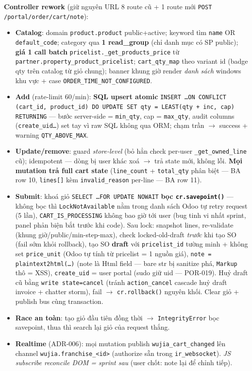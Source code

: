 \textbf{Controller rework} (giữ nguyên URL 8 route cũ + 1 route mới \texttt{POST
/portal/order/cart/note}):
\begin{itemize}
\item \textbf{Catalog}: domain \texttt{product.product} public+active; keyword tìm
      \texttt{name} OR \texttt{default\_code}; category qua \textbf{1 read\_group} (chỉ danh mục
      có SP public); \textbf{giá 1 call batch} \texttt{pricelist.\_get\_products\_price} từ
      \texttt{partner.property\_product\_pricelist}; \texttt{cart\_qty\_map} theo variant id
      (badge qty trên catalog từ giỏ chung); banner khung giờ render \emph{danh sách} windows
      khu vực + case \texttt{ORDER\_TIME\_NOT\_CONFIGURED}.
\item \textbf{Add} (rate-limit 60/min): \textbf{SQL upsert atomic} \texttt{INSERT \ldots ON
      CONFLICT (cart\_id, product\_id) DO UPDATE SET qty = LEAST(qty + inc, cap) RETURNING}
      --- bước server-side = \texttt{min\_qty}, cap = \texttt{max\_qty}, audit columns
      (\texttt{create\_uid\ldots}) set tay vì raw SQL không qua ORM; chạm trần $\rightarrow$
      success + warning \texttt{QTY\_ABOVE\_MAX}.
\item \textbf{Update/remove}: guard \emph{store-level} (bỏ hẳn check per-user
      \texttt{\_get\_owned\_line} cũ); idempotent --- dòng bị user khác xoá $\rightarrow$ trả state
      mới, không lỗi. \textbf{Mọi mutation trả full cart state} (\texttt{line\_count} +
      \texttt{total\_qty} phân biệt --- BA row 10, \texttt{lines[]} kèm
      \texttt{invalid\_reason} per-line --- BA row 11).
\item \textbf{Submit}: khoá giỏ \texttt{SELECT \ldots FOR UPDATE NOWAIT} \textbf{bọc
      \texttt{cr.savepoint()}} --- không bọc thì \texttt{LockNotAvailable} nằm trong danh sách
      Odoo tự retry request (5 lần), \texttt{CART\_IS\_PROCESSING} không bao giờ tới user
      (bug tinh vi nhất sprint, panel phản biện bắt trước khi code). Sau lock: snapshot lines,
      re-validate (khung giờ/public/min-step-max), check locked-old-draft \emph{trước} khi tạo
      SO (fail sớm khỏi rollback), tạo SO \textbf{draft} với \texttt{pricelist\_id} tường minh
      + không set \texttt{price\_unit} (Odoo tự tính từ pricelist = 1 nguồn giá),
      \texttt{note = plaintext2html(\ldots)} (note là Html field --- bare str bị sanitize phá,
      \texttt{Markup} thô = XSS), \texttt{create\_uid} = user portal (sudo giữ uid --- POR-019).
      Huỷ draft cũ bằng \texttt{write state=cancel} (tránh \texttt{action\_cancel} cascade huỷ
      draft invoice + chatter storm), fail $\rightarrow$ \texttt{cr.rollback()} nguyên khối.
      Clear giỏ + publish bus cùng transaction.
\item \textbf{Race an toàn}: tạo giỏ đầu tiên đồng thời $\rightarrow$ \texttt{IntegrityError}
      bọc savepoint, thua thì search lại giỏ của request thắng.
\item \textbf{Realtime} (ADR-006): mọi mutation publish \texttt{wujia\_cart\_changed} lên
      channel \texttt{wujia.franchise\_<id>} (authorize sẵn trong \texttt{ir\_websocket}).
      \emph{JS subscribe reconcile DOM = sprint sau} (user chốt: note lại để chỉnh tiếp).
\end{itemize}

